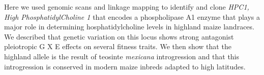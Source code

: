 \documentclass[9pt,twocolumn,twoside,lineno]{BioRxiv}
\begin{document}
Here we used genomic scans and linkage mapping to identify and clone \textit{HPC1, High PhosphatidylCholine 1} that encodes a phospholipase A1 enzyme that plays a major role in determining hosphatidylcholine levels in highland maize landraces.
We described that genetic variation on this locus shows strong antagonist pleiotropic G X E effects on several fitness traits.
We then show that the highland allele is the result of teosinte \textit{mexicana} introgression and that this introgression is conserved in modern maize inbreds adapted to high latitudes.
\end{document}
